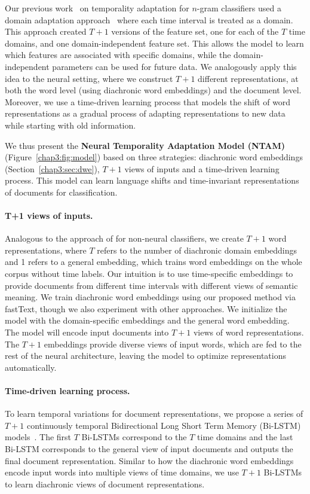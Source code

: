 Our previous work~\cite{huang2018examining} on temporality adaptation for $n$-gram classifiers used a domain adaptation approach~\cite{daume2007frustratingly} where 
each time interval is treated as a domain.
This approach created $T+1$ versions of the feature set, one for each of the $T$ time domains, and one domain-independent feature set.
This allows the model to learn which features are associated with specific domains, while the domain-independent parameters can be used for future data.
We analogously apply this idea to the neural setting, where we construct $T+1$ different representations, at both the word level (using diachronic word embeddings) and the document level.
Moreover, we use a time-driven learning process that models
the shift of word representations as a gradual process of adapting representations to new data while starting with old information.

We thus present the {\bf Neural Temporality Adaptation Model (NTAM)} (Figure~\ref{chap3:fig:model}) based on three strategies: diachronic word embeddings (Section~\ref{chap3:sec:dwe}), $T+1$ views of inputs and a time-driven learning process.
This model can learn language shifts and time-invariant representations of documents for classification.

\paragraph{T+1 views of inputs.}
Analogous to the approach of \cite{daume2007frustratingly} for non-neural classifiers, 
we create $T+1$ word representations, where $T$ refers to the number of diachronic domain embeddings and 1 refers to a general embedding, which trains word embeddings on the whole corpus without time labels. Our intuition is to use time-specific embeddings to provide documents from different time intervals with different views of semantic meaning. 
We train diachronic word embeddings using our proposed method via fastText, though we also experiment with other approaches. 
We initialize the model with the domain-specific embeddings and the general word embedding. The model will encode input documents into $T+1$ views of word representations. 
The $T+1$ embeddings provide diverse views of input words, which are fed to the rest of the neural architecture, leaving the model to optimize representations automatically.

\paragraph{Time-driven learning process.}
To learn temporal variations for document representations, we propose a series of $T+1$ continuously temporal Bidirectional Long Short Term Memory (Bi-LSTM) models~\cite{hochreiter1997long}. The first $T$ Bi-LSTMs correspond to the $T$ time domains and the last Bi-LSTM corresponds to the general view of input documents and outputs the final document representation. Similar to how the diachronic word embeddings encode input words into multiple views of time domains, we use $T+1$ Bi-LSTMs to learn diachronic views of document representations. 


